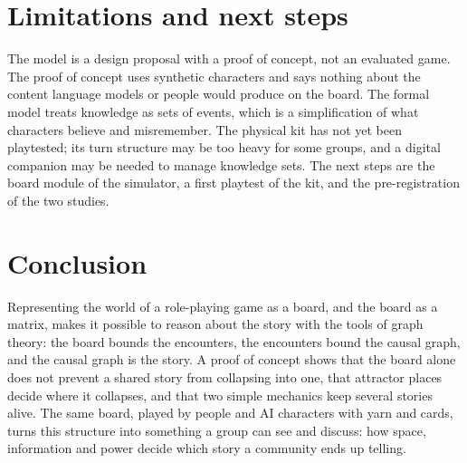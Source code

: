 \documentclass[11pt]{article}
\begin{document}
\section{Limitations and next steps}

The model is a design proposal with a proof of concept, not an evaluated
game. The proof of concept uses synthetic characters and says nothing about
the content language models or people would produce on the board. The
formal model treats knowledge as sets of events, which is a simplification of
what characters believe and misremember. The physical kit has not yet been
playtested; its turn structure may be too heavy for some groups, and a
digital companion may be needed to manage knowledge sets. The next steps are
the board module of the simulator, a first playtest of the kit, and the
pre-registration of the two studies.

\section{Conclusion}

Representing the world of a role-playing game as a board, and the board as a
matrix, makes it possible to reason about the story with the tools of graph
theory: the board bounds the encounters, the encounters bound the causal
graph, and the causal graph is the story. A proof of concept shows that the
board alone does not prevent a shared story from collapsing into one, that
attractor places decide where it collapses, and that two simple mechanics
keep several stories alive. The same board, played by people and AI
characters with yarn and cards, turns this structure into something a group
can see and discuss: how space, information and power decide which story a
community ends up telling.

\printbibliography
\end{document}
